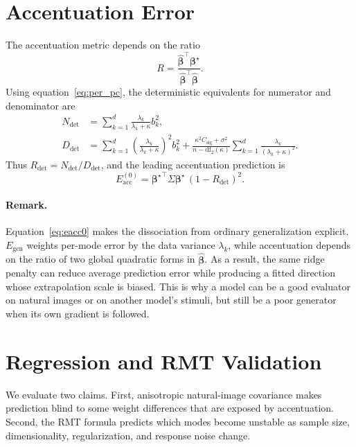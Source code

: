 \documentclass{article}
\newcommand{\bhat}{\widehat{\boldsymbol{\beta}}}
\newcommand{\btrue}{\boldsymbol{\beta}^{\star}}
\newcommand{\df}{\mathrm{df}_{2}}
\newcommand{\Eacc}{E_{\mathrm{acc}}}
\begin{document}
\section{Accentuation Error}

The accentuation metric depends on the ratio
\begin{equation}
    R=\frac{\bhat^\top\btrue}{\bhat^\top\bhat}.
\end{equation}
Using equation~\ref{eq:per_pc}, the deterministic equivalents for numerator and denominator are
\begin{align}
    N_{\det}
    &= \sum_{k=1}^{d}\frac{\lambda_k}{\lambda_k+\kappa}b_k^2,\\
    D_{\det}
    &= \sum_{k=1}^{d}\left(\frac{\lambda_k}{\lambda_k+\kappa}\right)^2b_k^2
    +
    \frac{\kappa^2 C_{\mathrm{sig}}+\sigma^2}{n-\df(\kappa)}
    \sum_{k=1}^{d}\frac{\lambda_k}{(\lambda_k+\kappa)^2}.
\end{align}
Thus $R_{\det}=N_{\det}/D_{\det}$, and the leading accentuation prediction is
\begin{equation}
    \Eacc^{(0)}
    =
    {\btrue}^{\top}\Sigma\btrue\,(1-R_{\det})^2.
    \label{eq:eacc0}
\end{equation}

\paragraph{Remark.}
Equation~\ref{eq:eacc0} makes the dissociation from ordinary generalization explicit. $E_{\mathrm{gen}}$ weights per-mode error by the data variance $\lambda_k$, while accentuation depends on the ratio of two global quadratic forms in $\bhat$. As a result, the same ridge penalty can reduce average prediction error while producing a fitted direction whose extrapolation scale is biased. This is why a model can be a good evaluator on natural images or on another model's stimuli, but still be a poor generator when its own gradient is followed.

\section{Regression and RMT Validation}

We evaluate two claims. First, anisotropic natural-image covariance makes prediction blind to some weight differences that are exposed by accentuation. Second, the RMT formula predicts which modes become unstable as sample size, dimensionality, regularization, and response noise change.
\end{document}

